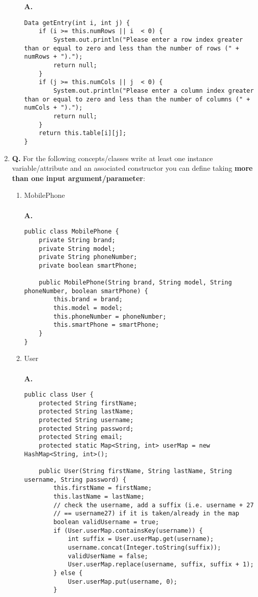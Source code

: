 \documentclass[12pt]{article}
\begin{document}
\begin{enumerate}
\begin{enumerate}[label=(\alph*)]
    \\\\
    \textbf{A.} 
    \begin{lstlisting}
Data getEntry(int i, int j) {
	if (i >= this.numRows || i  < 0) {
		System.out.println("Please enter a row index greater than or equal to zero and less than the number of rows (" + numRows + ").");
		return null;
	}
	if (j >= this.numCols || j  < 0) {
		System.out.println("Please enter a column index greater than or equal to zero and less than the number of columns (" + numCols + ").");
		return null;
	}
	return this.table[i][j];
}
  \end{lstlisting}
  \end{enumerate}
  \item
  \textbf{Q.} For the following concepts/classes write at least one instance variable/attribute and an associated constructor you can define taking \textbf{more than one input argument/parameter}:
  \begin{enumerate}[label=(\alph*)]
    \item MobilePhone
    \\\\
    \textbf{A.} 
    \begin{lstlisting}
public class MobilePhone {
	private String brand;
	private String model;
	private String phoneNumber;
	private boolean smartPhone;

	public MobilePhone(String brand, String model, String phoneNumber, boolean smartPhone) {
		this.brand = brand;
		this.model = model;
		this.phoneNumber = phoneNumber;
		this.smartPhone = smartPhone;
	}
}
    \end{lstlisting}
    \item User
    \\\\
    \textbf{A.} 
    \begin{lstlisting}
public class User {
	protected String firstName;
	protected String lastName;
	protected String username;
	protected String password;
	protected String email;
	protected static Map<String, int> userMap = new HashMap<String, int>();

	public User(String firstName, String lastName, String username, String password) {
		this.firstName = firstName;
		this.lastName = lastName;
		// check the username, add a suffix (i.e. username + 27
		// == username27) if it is taken/already in the map
		boolean validUsername = true;
		if (User.userMap.containsKey(username)) {
			int suffix = User.userMap.get(username);
			username.concat(Integer.toString(suffix));
			validUserName = false;
			User.userMap.replace(username, suffix, suffix + 1);
		} else {
			User.userMap.put(username, 0);
		}
		

\end{lstlisting}
\end{enumerate}
\end{enumerate}
\end{document}
